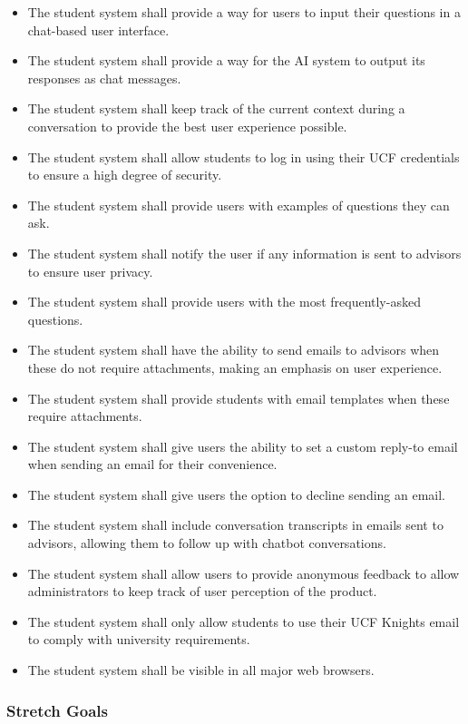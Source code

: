 \documentclass[titlepage, 12pt]{article}
\begin{document}
\begin{itemize}
    \item The student system shall provide a way for users to input their questions in a chat-based user interface.
    \item The student system shall provide a way for the AI system to output its responses as chat messages.
    \item The student system shall keep track of the current context during a conversation to provide the best user experience possible.
    \item The student system shall allow students to log in using their UCF credentials to ensure a high degree of security.
    \item The student system shall provide users with examples of questions they can ask.
    \item The student system shall notify the user if any information is sent to advisors to ensure user privacy.
    \item The student system shall provide users with the most frequently-asked questions.
    \item The student system shall have the ability to send emails to advisors when these do not require attachments, making an emphasis on user experience.
    \item The student system shall provide students with email templates when these require attachments. 
    \item The student system shall give users the ability to set a custom reply-to email when sending an email for their convenience.
    \item The student system shall give users the option to decline sending an email.
    \item The student system shall include conversation transcripts in emails sent to advisors, allowing them to follow up with chatbot conversations.
    \item The student system shall allow users to provide anonymous feedback to allow administrators to keep track of user perception of the product.
    \item The student system shall only allow students to use their UCF Knights email to comply with university requirements.
    \item The student system shall be visible in all major web browsers.
\end{itemize}

\subsubsection{Stretch Goals}
\end{document}

